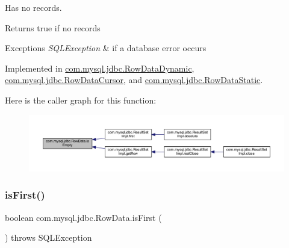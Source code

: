 Has no records.

\begin{DoxyReturn}{Returns}
true if no records 
\end{DoxyReturn}

\begin{DoxyExceptions}{Exceptions}
{\em S\+Q\+L\+Exception} & if a database error occurs \\
\hline
\end{DoxyExceptions}


Implemented in \mbox{\hyperlink{classcom_1_1mysql_1_1jdbc_1_1_row_data_dynamic_ae6bd51c674ff4442a649d4c3606d1aa6}{com.\+mysql.\+jdbc.\+Row\+Data\+Dynamic}}, \mbox{\hyperlink{classcom_1_1mysql_1_1jdbc_1_1_row_data_cursor_a80a9aff446cac640c3259b3c6f53b716}{com.\+mysql.\+jdbc.\+Row\+Data\+Cursor}}, and \mbox{\hyperlink{classcom_1_1mysql_1_1jdbc_1_1_row_data_static_ab306d052b3e0acc34495b3f2ab9ca5ce}{com.\+mysql.\+jdbc.\+Row\+Data\+Static}}.

Here is the caller graph for this function\+:
\nopagebreak
\begin{figure}[H]
\begin{center}
\leavevmode
\includegraphics[width=350pt]{interfacecom_1_1mysql_1_1jdbc_1_1_row_data_afe25c16468d9db9d9458db7b1c6004f1_icgraph}
\end{center}
\end{figure}
\mbox{\label{interfacecom_1_1mysql_1_1jdbc_1_1_row_data_a4bcee2924cecb7f100d887963d6b5b70}} 
\subsubsection{\texorpdfstring{is\+First()}{isFirst()}}
{\footnotesize\ttfamily boolean com.\+mysql.\+jdbc.\+Row\+Data.\+is\+First (\begin{DoxyParamCaption}{ }\end{DoxyParamCaption}) throws S\+Q\+L\+Exception}

